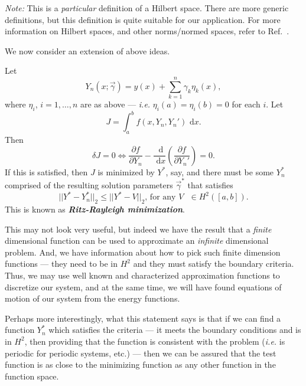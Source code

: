 \emph{Note:} This is a \emph{particular} definition of a Hilbert space. There are more generic definitions, but this definition is quite suitable for our application. For more information on Hilbert spaces, and other norms/normed spaces, refer to Ref.~\cite{brenner2008mathematical}.

We now consider an extension of above ideas. 
\begin{definition}
Let
\begin{equation}
Y_n(x;\vec\gamma) = y(x)+\sum_{k=1}^n\gamma_k\eta_k(x),
\end{equation}
where $\eta_i$, $i=1,\dots,n$ are as above --- \emph{i.e.} $\eta_i(a) = \eta_i(b) = 0$ for each $i$. Let 
\begin{equation}
J = \int_a^b{f(x,Y_n,Y_n')}\text{ d}x.
\end{equation}
Then 
\begin{equation}
\delta J = 0 \Leftrightarrow \frac{\partial f}{\partial Y_n}-\frac{\text{ d}}{\text{ d}x}\left(\frac{\partial f}{\partial Y_n'}\right) = 0.
\end{equation}
If this is satisfied, then $J$ is minimized by $Y^*$, say, and there must be some $Y_n^*$ comprised of the resulting solution parameters $\vec\gamma^*$ that satisfies
\begin{equation}
||Y^*-Y_n^*||_2\leq||Y^*-V||_2\text{, for any $V$ $\in H^2([a,b]).$}
\end{equation}
This is known as \emph{\textbf{Ritz-Rayleigh minimization}}.
\end{definition}
This may not look very useful, but indeed we have the result that a \emph{finite} dimensional function can be used to approximate an \emph{infinite} dimensional problem. And, we have information about how to pick such finite dimension functions --- they need to be in $H^2$ and they must satisfy the boundary criteria. Thus, we may use well known and characterized approximation functions to discretize our system, and at the same time, we will have found equations of motion of our system from the energy functions.

Perhaps more interestingly, what this statement says is that if we can find a function $Y^*_n$ which satisfies the criteria --- it meets the boundary conditions and is in $H^2$, then providing that the function is consistent with the problem (\emph{i.e.} is periodic for periodic systems, etc.) --- then we can be assured that the test function is as close to the minimizing function as any other function in the function space.

